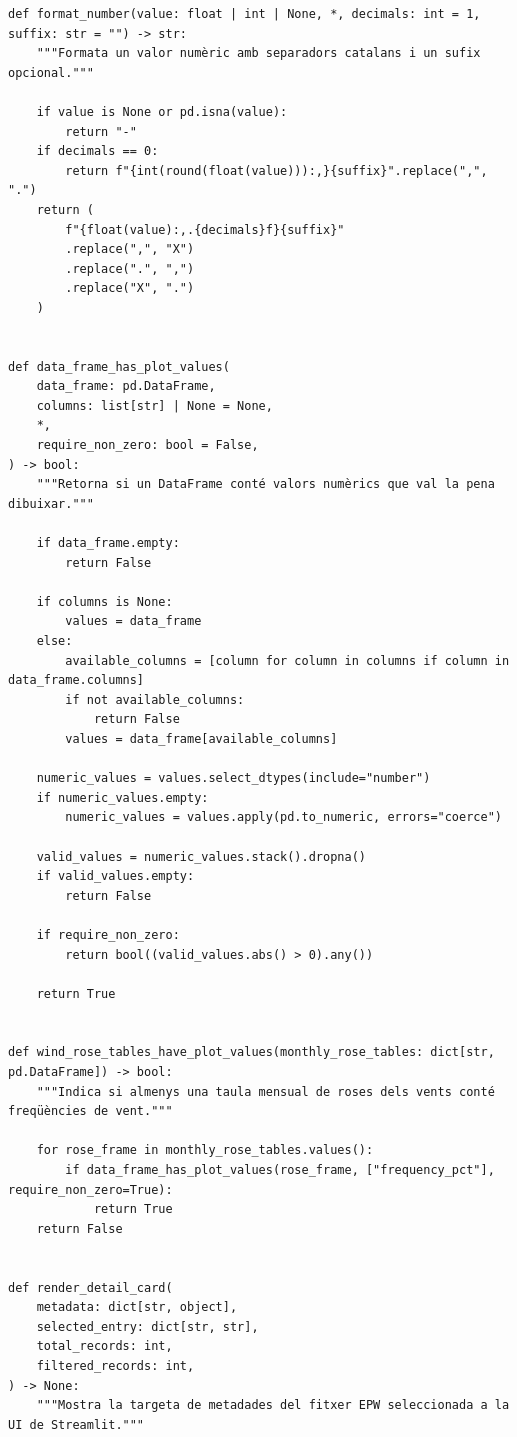 \documentclass[10pt,a4paper]{article}
\begin{document}
\begin{lstlisting}[style=studioPython,caption={pages/Visor\_Climes\_EPW.py},label={lst:pages-visor-climes-epw-py}]
def format_number(value: float | int | None, *, decimals: int = 1, suffix: str = "") -> str:
    """Formata un valor numèric amb separadors catalans i un sufix opcional."""

    if value is None or pd.isna(value):
        return "-"
    if decimals == 0:
        return f"{int(round(float(value))):,}{suffix}".replace(",", ".")
    return (
        f"{float(value):,.{decimals}f}{suffix}"
        .replace(",", "X")
        .replace(".", ",")
        .replace("X", ".")
    )


def data_frame_has_plot_values(
    data_frame: pd.DataFrame,
    columns: list[str] | None = None,
    *,
    require_non_zero: bool = False,
) -> bool:
    """Retorna si un DataFrame conté valors numèrics que val la pena dibuixar."""

    if data_frame.empty:
        return False

    if columns is None:
        values = data_frame
    else:
        available_columns = [column for column in columns if column in data_frame.columns]
        if not available_columns:
            return False
        values = data_frame[available_columns]

    numeric_values = values.select_dtypes(include="number")
    if numeric_values.empty:
        numeric_values = values.apply(pd.to_numeric, errors="coerce")

    valid_values = numeric_values.stack().dropna()
    if valid_values.empty:
        return False

    if require_non_zero:
        return bool((valid_values.abs() > 0).any())

    return True


def wind_rose_tables_have_plot_values(monthly_rose_tables: dict[str, pd.DataFrame]) -> bool:
    """Indica si almenys una taula mensual de roses dels vents conté freqüències de vent."""

    for rose_frame in monthly_rose_tables.values():
        if data_frame_has_plot_values(rose_frame, ["frequency_pct"], require_non_zero=True):
            return True
    return False


def render_detail_card(
    metadata: dict[str, object],
    selected_entry: dict[str, str],
    total_records: int,
    filtered_records: int,
) -> None:
    """Mostra la targeta de metadades del fitxer EPW seleccionada a la UI de Streamlit."""


\end{lstlisting}
\end{document}
